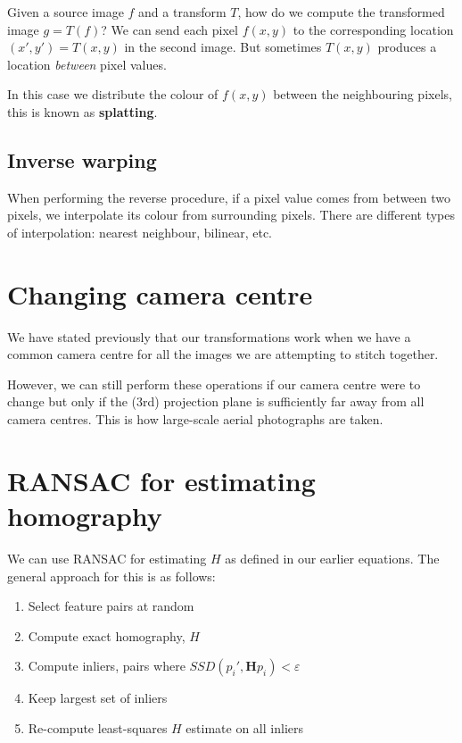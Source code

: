 \documentclass{article}
\begin{document}
  Given a source image $f$ and a transform $T$, how do we compute the transformed image $g = T(f)$? We can send each pixel $f(x,y)$ to the corresponding location $(x',y')=T(x,y) $ in the second image. But sometimes $T(x,y)$ produces a location \textit{between} pixel values.

  In this case we distribute the colour of $f(x,y)$ between the neighbouring pixels, this is known as \textbf{splatting}.

  \subsection{Inverse warping}

When performing the reverse procedure, if a pixel value comes from between two pixels, we interpolate its colour from surrounding pixels. There are different types of interpolation: nearest neighbour, bilinear, etc.

\section{Changing camera centre}

We have stated previously that our transformations work when we have a common camera centre for all the images we are attempting to stitch together.

However, we can still perform these operations if our camera centre were to change but only if the (3rd) projection plane is sufficiently far away from all camera centres. This is how large-scale aerial photographs are taken.

\section{RANSAC for estimating homography}

We can use RANSAC for estimating $H$ as defined in our earlier equations. The general approach for this is as follows:

\begin{enumerate}
  \item Select feature pairs at random
  \item Compute exact homography, $H$
  \item Compute inliers, pairs where $SSD(p_{i}', \mathbf{H}p_{i} ) < \varepsilon$
  \item Keep largest set of inliers
  \item Re-compute least-squares $H$ estimate on all inliers
\end{enumerate}
\end{document}
